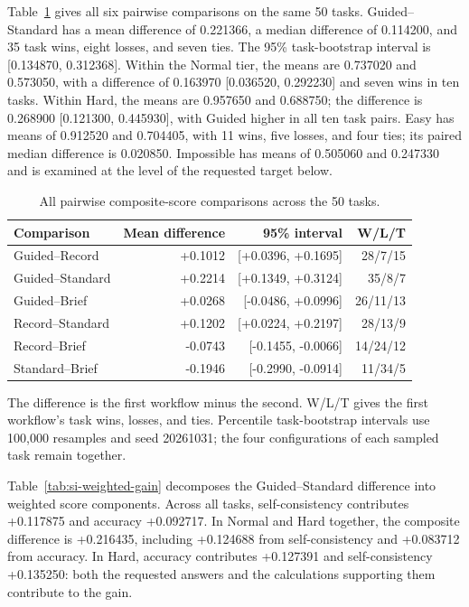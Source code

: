 Table~\ref{tab:si-pairwise} gives all six pairwise comparisons on the same 50 tasks. Guided--Standard has a mean difference of 0.221366, a median difference of 0.114200, and 35 task wins, eight losses, and seven ties. The 95\% task-bootstrap interval is [0.134870, 0.312368]. Within the Normal tier, the means are 0.737020 and 0.573050, with a difference of 0.163970 [0.036520, 0.292230] and seven wins in ten tasks. Within Hard, the means are 0.957650 and 0.688750; the difference is 0.268900 [0.121300, 0.445930], with Guided higher in all ten task pairs. Easy has means of 0.912520 and 0.704405, with 11 wins, five losses, and four ties; its paired median difference is 0.020850. Impossible has means of 0.505060 and 0.247330 and is examined at the level of the requested target below.

\begin{table}[!htbp]
\centering
\small
\caption{All pairwise composite-score comparisons across the 50 tasks.}
\label{tab:si-pairwise}
\begin{tabular}{lrrr}
\toprule
Comparison & Mean difference & 95\% interval & W/L/T \\
\midrule
Guided--Record & +0.1012 & [+0.0396, +0.1695] & 28/7/15 \\
Guided--Standard & +0.2214 & [+0.1349, +0.3124] & 35/8/7 \\
Guided--Brief & +0.0268 & [-0.0486, +0.0996] & 26/11/13 \\
Record--Standard & +0.1202 & [+0.0224, +0.2197] & 28/13/9 \\
Record--Brief & -0.0743 & [-0.1455, -0.0066] & 14/24/12 \\
Standard--Brief & -0.1946 & [-0.2990, -0.0914] & 11/34/5 \\
\bottomrule
\end{tabular}
\par\smallskip\begin{minipage}{\linewidth}\footnotesize The difference is the first workflow minus the second. W/L/T gives the first workflow's task wins, losses, and ties. Percentile task-bootstrap intervals use 100,000 resamples and seed 20261031; the four configurations of each sampled task remain together.\end{minipage}
\end{table}

Table~\ref{tab:si-weighted-gain} decomposes the Guided--Standard difference into weighted score components. Across all tasks, self-consistency contributes +0.117875 and accuracy +0.092717. In Normal and Hard together, the composite difference is +0.216435, including +0.124688 from self-consistency and +0.083712 from accuracy. In Hard, accuracy contributes +0.127391 and self-consistency +0.135250: both the requested answers and the calculations supporting them contribute to the gain.

